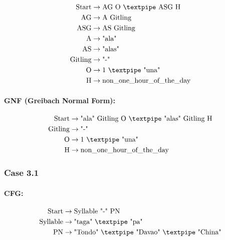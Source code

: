 \begin{equation*}
    \begin{aligned}
        \text{Start}   & \rightarrow \text{AG O {\textpipe} ASG H} \\
        \text{AG}      & \rightarrow \text{A Gitling}\\
        \text{ASG}      & \rightarrow \text{AS Gitling}\\
        \text{A}    & \rightarrow \text{"ala"}\\
        \text{AS}    & \rightarrow \text{"alas"}\\
        \text{Gitling} & \rightarrow \text{"-"}\\
        \text{O}   & \rightarrow \text{1 {\textpipe} "una"}\\
        \text{H}   & \rightarrow \text{non\_one\_hour\_of\_the\_day}
    \end{aligned}
\end{equation*}

\paragraph{GNF (Greibach Normal Form):}

\begin{equation*}
    \begin{aligned}
        \text{Start}   & \rightarrow \text{"ala" Gitling O {\textpipe} "alas" Gitling H}\\
        \text{Gitling} & \rightarrow \text{"-"}\\
        \text{O}   & \rightarrow \text{1 {\textpipe} "una"}\\
        \text{H}   & \rightarrow \text{non\_one\_hour\_of\_the\_day}
    \end{aligned}
\end{equation*}

\subsubsection{Case 3.1}

\paragraph{CFG:}

\begin{equation*}
    \begin{aligned}
        \text{Start}  & \rightarrow \text{Syllable "-" PN}   \\
        \text{Syllable}    & \rightarrow \text{"taga" {\textpipe} "pa"}\\
        \text{PN} & \rightarrow \text{"Tondo" {\textpipe} "Davao" {\textpipe} "China"}   \\
    \end{aligned}
\end{equation*}

